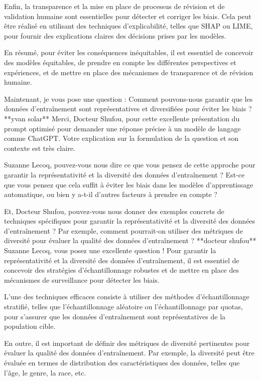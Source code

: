 Enfin, la transparence et la mise en place de processus de révision et de validation humaine sont essentielles pour détecter et corriger les biais. Cela peut être réalisé en utilisant des techniques d'explicabilité, telles que SHAP ou LIME, pour fournir des explications claires des décisions prises par les modèles.

En résumé, pour éviter les conséquences inéquitables, il est essentiel de concevoir des modèles équitables, de prendre en compte les différentes perspectives et expériences, et de mettre en place des mécanismes de transparence et de révision humaine.

Maintenant, je vous pose une question : Comment pouvons-nous garantir que les données d'entraînement sont représentatives et diversifiées pour éviter les biais ?**yvan solar**
Merci, Docteur Shufou, pour cette excellente présentation du prompt optimisé pour demander une réponse précise à un modèle de langage comme ChatGPT. Votre explication sur la formulation de la question et son contexte est très claire.

Suzanne Lecoq, pouvez-vous nous dire ce que vous pensez de cette approche pour garantir la représentativité et la diversité des données d'entraînement ? Est-ce que vous pensez que cela suffit à éviter les biais dans les modèles d'apprentissage automatique, ou bien y a-t-il d'autres facteurs à prendre en compte ?

Et, Docteur Shufou, pouvez-vous nous donner des exemples concrets de techniques spécifiques pour garantir la représentativité et la diversité des données d'entraînement ? Par exemple, comment pourrait-on utiliser des métriques de diversité pour évaluer la qualité des données d'entraînement ?
**docteur shufou**
Suzanne Lecoq, vous posez une excellente question ! Pour garantir la représentativité et la diversité des données d'entraînement, il est essentiel de concevoir des stratégies d'échantillonnage robustes et de mettre en place des mécanismes de surveillance pour détecter les biais.

L'une des techniques efficaces consiste à utiliser des méthodes d'échantillonnage stratifié, telles que l'échantillonnage aléatoire ou l'échantillonnage par quotas, pour s'assurer que les données d'entraînement sont représentatives de la population cible.

En outre, il est important de définir des métriques de diversité pertinentes pour évaluer la qualité des données d'entraînement. Par exemple, la diversité peut être évaluée en termes de distribution des caractéristiques des données, telles que l'âge, le genre, la race, etc.

